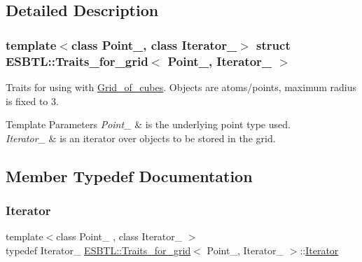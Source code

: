 \subsection{Detailed Description}
\subsubsection*{template$<$class Point\+\_\+, class Iterator\+\_\+$>$\newline
struct E\+S\+B\+T\+L\+::\+Traits\+\_\+for\+\_\+grid$<$ Point\+\_\+, Iterator\+\_\+ $>$}

Traits for using with \hyperlink{structESBTL_1_1Grid__of__cubes}{Grid\+\_\+of\+\_\+cubes}. Objects are atoms/points, maximum radius is fixed to 3. 
\begin{DoxyTemplParams}{Template Parameters}
{\em Point\+\_\+} & is the underlying point type used. \\
\hline
{\em Iterator\+\_\+} & is an iterator over objects to be stored in the grid. \\
\hline
\end{DoxyTemplParams}


\subsection{Member Typedef Documentation}
\mbox{\label{structESBTL_1_1Traits__for__grid_af8465e0f6ef165f72a3ca602e5b17445}} 
\subsubsection{\texorpdfstring{Iterator}{Iterator}}
{\footnotesize\ttfamily template$<$class Point\+\_\+ , class Iterator\+\_\+ $>$ \\
typedef Iterator\+\_\+ \hyperlink{structESBTL_1_1Traits__for__grid}{E\+S\+B\+T\+L\+::\+Traits\+\_\+for\+\_\+grid}$<$ Point\+\_\+, Iterator\+\_\+ $>$\+::\hyperlink{structESBTL_1_1Traits__for__grid_af8465e0f6ef165f72a3ca602e5b17445}{Iterator}}

\mbox{\label{structESBTL_1_1Traits__for__grid_a2d1eddf80f02f912cd39b58c9356dd83}} 
